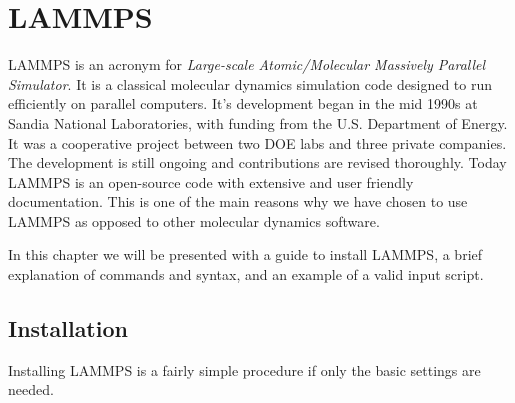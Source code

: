 \documentclass[twoside,english]{uiofysmaster}
\begin{document}
  

\begin{figure}[H]
\end{figure}




























\chapter{LAMMPS}

LAMMPS is an acronym for \textit{Large-scale Atomic/Molecular Massively Parallel Simulator}. 
It is a classical molecular dynamics simulation code designed to run efficiently on parallel computers. 
It's development began in the mid 1990s at Sandia National Laboratories, with funding from the U.S. Department of Energy. 
It was a cooperative project between two DOE labs and three private companies. 
The development is still ongoing and contributions are revised thoroughly. 
Today LAMMPS is an open-source code with extensive and user friendly documentation. 
This is one of the main reasons why we have chosen to use LAMMPS as opposed to other molecular dynamics software. 

In this chapter we will be presented with a guide to install LAMMPS, a brief explanation of commands and syntax, and an example of a valid input script.
\section{Installation}
Installing LAMMPS is a fairly simple procedure if only the basic settings are needed.
\end{document}
